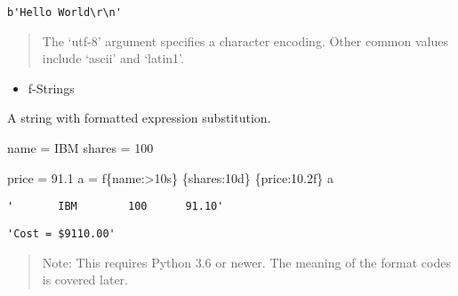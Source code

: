 \documentclass[
  letterpaper,
  DIV=11,
  numbers=noendperiod]{scrreprt}
\newenvironment{Shaded}{\begin{snugshade}}{\end{snugshade}}
\newcommand{\DecValTok}[1]{\textcolor[rgb]{0.68,0.00,0.00}{#1}}
\newcommand{\FloatTok}[1]{\textcolor[rgb]{0.68,0.00,0.00}{#1}}
\newcommand{\NormalTok}[1]{\textcolor[rgb]{0.00,0.46,0.62}{#1}}
\newcommand{\OperatorTok}[1]{\textcolor[rgb]{0.37,0.37,0.37}{#1}}
\newcommand{\FloatTok}[1]{\textcolor[rgb]{0.68,0.00,0.00}{#1}}
\newcommand{\NormalTok}[1]{\textcolor[rgb]{0.00,0.48,0.65}{#1}}
\newcommand{\OperatorTok}[1]{\textcolor[rgb]{0.37,0.37,0.37}{#1}}
\newcommand{\SpecialCharTok}[1]{\textcolor[rgb]{0.37,0.37,0.37}{#1}}
\newcommand{\SpecialStringTok}[1]{\textcolor[rgb]{0.13,0.47,0.30}{#1}}
\newcommand{\StringTok}[1]{\textcolor[rgb]{0.13,0.47,0.30}{#1}}
\providecommand{\tightlist}{%
  \setlength{\itemsep}{0pt}\setlength{\parskip}{0pt}}
\begin{document}
\begin{Shaded}
\begin{Highlighting}[]
\begin{verbatim}
b'Hello World\r\n'
\end{verbatim}

\begin{quote}
The `utf-8' argument specifies a character encoding. Other common values
include `ascii' and `latin1'.
\end{quote}

\begin{itemize}
\tightlist
\item
  f-Strings
\end{itemize}

A string with formatted expression substitution.

\begin{Shaded}
\begin{Highlighting}[]
\NormalTok{name }\OperatorTok{=} \StringTok{\textquotesingle{}IBM\textquotesingle{}}
\NormalTok{shares }\OperatorTok{=} \DecValTok{100}

\NormalTok{price }\OperatorTok{=} \FloatTok{91.1}
\NormalTok{a }\OperatorTok{=} \SpecialStringTok{f\textquotesingle{}}\SpecialCharTok{\{}\NormalTok{name}\SpecialCharTok{:\textgreater{}10s\}}\SpecialStringTok{ }\SpecialCharTok{\{}\NormalTok{shares}\SpecialCharTok{:10d\}}\SpecialStringTok{ }\SpecialCharTok{\{}\NormalTok{price}\SpecialCharTok{:10.2f\}}\SpecialStringTok{\textquotesingle{}}
\NormalTok{a}
\end{Highlighting}
\end{Shaded}

\begin{verbatim}
'       IBM        100      91.10'
\end{verbatim}

\begin{Shaded}
\end{Shaded}

\begin{verbatim}
'Cost = $9110.00'
\end{verbatim}

\begin{quote}
Note: This requires Python 3.6 or newer. The meaning of the format codes
is covered later.
\end{quote}


\end{Highlighting}
\end{Shaded}
\end{document}
